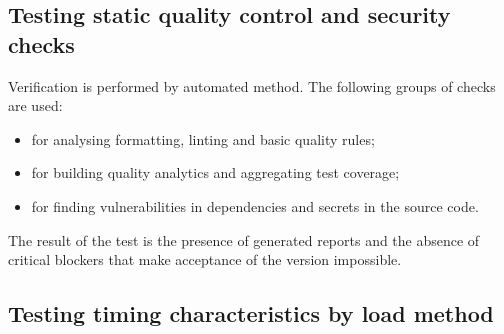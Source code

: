 \documentclass[12pt,a4paper]{extarticle}
\begin{document}
\subsection{Testing static quality control and security checks}

\begin{hseExample}
Verification is performed by automated method. The following groups of checks are used:

\begin{itemize}[leftmargin=1.25cm]
    \item {} for analysing formatting, linting and basic quality rules;
    \item {} for building quality analytics and aggregating test coverage;
    \item {} for finding vulnerabilities in dependencies and secrets in the source code.
\end{itemize}

The result of the test is the presence of generated reports and the absence of critical blockers that make acceptance of the version impossible.
\end{hseExample}

\subsection{Testing timing characteristics by load method}
\end{document}
